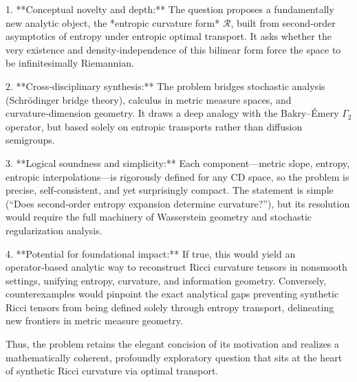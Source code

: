 1. **Conceptual novelty and depth:**  
   The question proposes a fundamentally new analytic object, the *entropic curvature form* \(\mathcal{R}\), built from second‑order asymptotics of entropy under entropic optimal transport.  
   It asks whether the very existence and density‑independence of this bilinear form force the space to be infinitesimally Riemannian.  

2. **Cross‑disciplinary synthesis:**  
   The problem bridges stochastic analysis (Schrödinger bridge theory), calculus in metric measure spaces, and curvature‑dimension geometry. It draws a deep analogy with the Bakry–Émery \(\Gamma_2\) operator, but based solely on entropic transports rather than diffusion semigroups.  

3. **Logical soundness and simplicity:**  
   Each component—metric slope, entropy, entropic interpolations—is rigorously defined for any CD space, so the problem is precise, self‑consistent, and yet surprisingly compact.  
   The statement is simple (“Does second‑order entropy expansion determine curvature?”), but its resolution would require the full machinery of Wasserstein geometry and stochastic regularization analysis.  

4. **Potential for foundational impact:**  
   If true, this would yield an operator‑based analytic way to reconstruct Ricci curvature tensors in nonsmooth settings, unifying entropy, curvature, and information geometry.  
   Conversely, counterexamples would pinpoint the exact analytical gaps preventing synthetic Ricci tensors from being defined solely through entropy transport, delineating new frontiers in metric measure geometry.  

Thus, the problem retains the elegant concision of its motivation and realizes a mathematically coherent, profoundly exploratory question that sits at the heart of synthetic Ricci curvature via optimal transport.